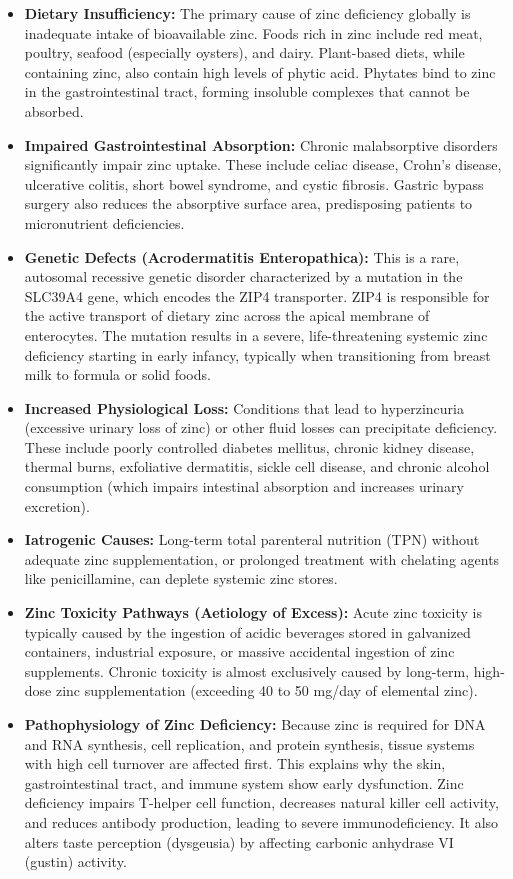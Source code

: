 \begin{itemize}
    \item \textbf{Dietary Insufficiency:} The primary cause of zinc deficiency globally is inadequate intake of bioavailable zinc. Foods rich in zinc include red meat, poultry, seafood (especially oysters), and dairy. Plant-based diets, while containing zinc, also contain high levels of phytic acid. Phytates bind to zinc in the gastrointestinal tract, forming insoluble complexes that cannot be absorbed.
    \item \textbf{Impaired Gastrointestinal Absorption:} Chronic malabsorptive disorders significantly impair zinc uptake. These include celiac disease, Crohn's disease, ulcerative colitis, short bowel syndrome, and cystic fibrosis. Gastric bypass surgery also reduces the absorptive surface area, predisposing patients to micronutrient deficiencies.
    \item \textbf{Genetic Defects (Acrodermatitis Enteropathica):} This is a rare, autosomal recessive genetic disorder characterized by a mutation in the SLC39A4 gene, which encodes the ZIP4 transporter. ZIP4 is responsible for the active transport of dietary zinc across the apical membrane of enterocytes. The mutation results in a severe, life-threatening systemic zinc deficiency starting in early infancy, typically when transitioning from breast milk to formula or solid foods.
    \item \textbf{Increased Physiological Loss:} Conditions that lead to hyperzincuria (excessive urinary loss of zinc) or other fluid losses can precipitate deficiency. These include poorly controlled diabetes mellitus, chronic kidney disease, thermal burns, exfoliative dermatitis, sickle cell disease, and chronic alcohol consumption (which impairs intestinal absorption and increases urinary excretion).
    \item \textbf{Iatrogenic Causes:} Long-term total parenteral nutrition (TPN) without adequate zinc supplementation, or prolonged treatment with chelating agents like penicillamine, can deplete systemic zinc stores.
    \item \textbf{Zinc Toxicity Pathways (Aetiology of Excess):} Acute zinc toxicity is typically caused by the ingestion of acidic beverages stored in galvanized containers, industrial exposure, or massive accidental ingestion of zinc supplements. Chronic toxicity is almost exclusively caused by long-term, high-dose zinc supplementation (exceeding 40 to 50 mg/day of elemental zinc).
    \item \textbf{Pathophysiology of Zinc Deficiency:} Because zinc is required for DNA and RNA synthesis, cell replication, and protein synthesis, tissue systems with high cell turnover are affected first. This explains why the skin, gastrointestinal tract, and immune system show early dysfunction. Zinc deficiency impairs T-helper cell function, decreases natural killer cell activity, and reduces antibody production, leading to severe immunodeficiency. It also alters taste perception (dysgeusia) by affecting carbonic anhydrase VI (gustin) activity.

\end{itemize}
